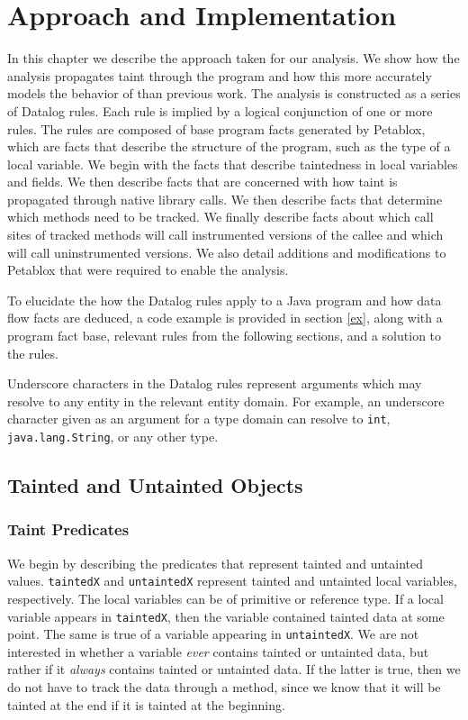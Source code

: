 \chapter{Approach and Implementation}
In this chapter we describe the approach taken for our analysis. We
show how the analysis propagates taint through the program and how
this more accurately models the behavior of \phosphor{} than previous
work. The analysis is constructed as a series of Datalog rules. Each
rule is implied by a logical conjunction of one or more rules. The
rules are composed of base program facts generated by Petablox, which
are facts that describe the structure of the program, such as the type
of a local variable. We begin with the facts that describe taintedness
in local variables and fields. We then describe facts that are
concerned with how taint is propagated through native library
calls. We then describe facts that determine which methods need to be
tracked. We finally describe facts about which call sites of tracked
methods will call instrumented versions of the callee and which will
call uninstrumented versions. We also detail additions and
modifications to Petablox that were required to enable the analysis.

To elucidate the how the Datalog rules apply to a Java program and how
data flow facts are deduced, a code example is provided in section
\ref{ex}, along with a program fact base, relevant rules from the
following sections, and a solution to the rules.

Underscore characters in the Datalog rules represent arguments which
may resolve to any entity in the relevant entity domain. For example,
an underscore character given as an argument for a type domain can
resolve to \texttt{int}, \texttt{java.lang.String}, or any other type.

\section{Tainted and Untainted Objects}
\subsection{Taint Predicates}
We begin by describing the predicates that represent tainted and
untainted values. \texttt{taintedX} and \texttt{untaintedX} represent
tainted and untainted local variables, respectively. The local
variables can be of primitive or reference type. If a local variable
appears in \texttt{taintedX}, then the variable contained tainted data
at some point. The same is true of a variable appearing in
\texttt{untaintedX}. We are not interested in whether a variable
\textit{ever} contains tainted or untainted data, but rather if it
\textit{always} contains tainted or untainted data. If the latter is
true, then we do not have to track the data through a method, since we
know that it will be tainted at the end if it is tainted at the
beginning.


